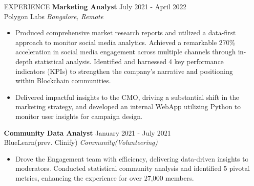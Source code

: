 \documentclass{resume} %
\begin{document}
\begin{rSection}{EXPERIENCE}
\textbf{Marketing Analyst} \hfill July 2021 - April 2022\\
Polygon Labs \hfill \textit{Bangalore, Remote}
 \begin{itemize}
    \itemsep -3pt {} 
    \item Produced comprehensive market research reports and utilized a data-first approach to monitor social media analytics. Achieved a remarkable 270\% acceleration in social media engagement across multiple channels through in-depth statistical analysis. Identified and harnessed 4 key performance indicators (KPIs) to strengthen the company's narrative and positioning within Blockchain communities.
    \item Delivered impactful insights to the CMO, driving a substantial shift in the marketing strategy, and developed an internal WebApp utilizing Python to monitor user insights for campaign design.
 \end{itemize}

\textbf{Community Data Analyst} \hfill January 2021 - July 2021\\
BlueLearn(prev. Clinify) \hfill \textit{Community(Volunteering)}
 \begin{itemize}
    \itemsep -3pt {} 
    \item Drove the Engagement team with efficiency, delivering data-driven insights to moderators. Conducted statistical community analysis and identified 5 pivotal metrics, enhancing the experience for over 27,000 members.
 \end{itemize}
 

\end{rSection}
\end{document}
